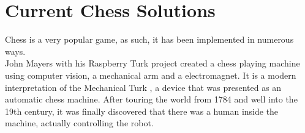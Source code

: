 \newpage
\section{Current Chess Solutions}

Chess is a very popular game, as such, it has been implemented in numerous ways.\\

John Mayers \cite{raspberryturk} with his Raspberry Turk project created a chess playing machine using computer vision, a mechanical arm and a electromagnet. It is a modern interpretation of the Mechanical Turk \cite{schaffer1999enlightened}, a device that was presented as an automatic chess machine. After touring the world from 1784 and well into the 19th century, it was finally discovered that there was a human inside the machine, actually controlling the robot. 


